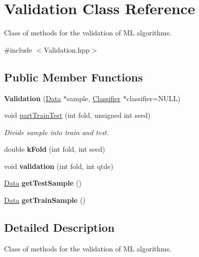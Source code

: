 \hypertarget{class_validation}{}\section{Validation Class Reference}
\label{class_validation}


Class of methods for the validation of ML algorithms.  




{\ttfamily \#include $<$Validation.\+hpp$>$}

\subsection*{Public Member Functions}
\begin{DoxyCompactItemize}
\item 
\mbox{\label{class_validation_a54a1ace2df11df3937c96cddd8b46f93}} 
{\bfseries Validation} (\hyperlink{class_data}{Data} $\ast$sample, \hyperlink{class_classifier}{Classifier} $\ast$classifier=N\+U\+LL)
\item 
void \hyperlink{class_validation_a83b3cc552927fe8595f3cdd143d645c0}{part\+Train\+Test} (int fold, unsigned int seed)
\begin{DoxyCompactList}\small\item\em Divide sample into train and test. \end{DoxyCompactList}\item 
\mbox{\label{class_validation_a3aae72caef37b12a57aaf5cdd862de3a}} 
double {\bfseries k\+Fold} (int fold, int seed)
\item 
\mbox{\label{class_validation_a166305aa3f117b119da69d54778286a0}} 
void {\bfseries validation} (int fold, int qtde)
\item 
\mbox{\label{class_validation_a6ef1b8600535a064b9a94507afdf849c}} 
\hyperlink{class_data}{Data} {\bfseries get\+Test\+Sample} ()
\item 
\mbox{\label{class_validation_a656f4919ec48a7f26063d046d583433a}} 
\hyperlink{class_data}{Data} {\bfseries get\+Train\+Sample} ()
\end{DoxyCompactItemize}


\subsection{Detailed Description}
Class of methods for the validation of ML algorithms. 

